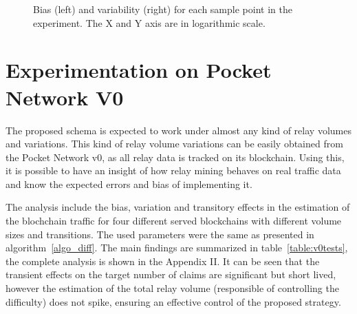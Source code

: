 \documentclass[runningheads]{llncs}
\begin{document}
\begin{figure}
    \centering
    \qquad
    \caption{Bias (left) and variability (right)  for each sample point in the experiment. The X and Y axis are in logarithmic scale.}%
\end{figure}


\section{Experimentation on Pocket Network V0}

The proposed schema is expected to work under almost any kind of relay volumes and variations. This kind of relay volume variations can be easily obtained from the Pocket Network v0, as all relay data is tracked on its blockchain. Using this, it is possible to have an insight of how relay mining behaves on real traffic data and know the expected errors and bias of implementing it. 

The analysis include the bias, variation and transitory effects in the estimation of the blochchain traffic for four different served blockchains with different volume sizes and transitions. The used parameters were the same as presented in algorithm~\ref{algo_diff}. The main findings are summarized in table~\ref{table:v0tests}, the complete analysis is shown in the Appendix II. It can be seen that the transient effects on the target number of claims are significant but short lived, however the estimation of the total relay volume (responsible of controlling the difficulty) does not spike, ensuring an effective control of the proposed strategy.
\end{document}
